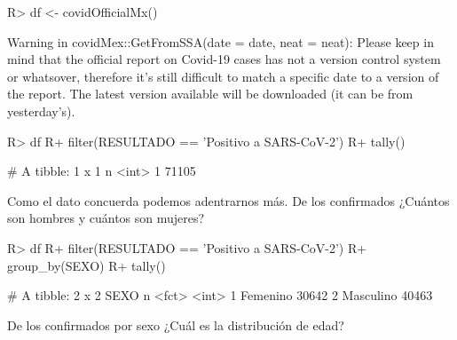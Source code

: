 \documentclass[
]{jss}
\begin{document}
\begin{CodeChunk}

\begin{CodeInput}
R> df <- covidOfficialMx()
\end{CodeInput}

\begin{CodeOutput}
Warning in covidMex::GetFromSSA(date = date, neat = neat): Please keep in mind
that the official report on Covid-19 cases has not a version control system or
whatsover, therefore it's still difficult to match a specific date to a version
of the report. The latest version available will be downloaded (it can be from
yesterday's).
\end{CodeOutput}

\begin{CodeInput}
R> df %
R+   filter(RESULTADO == 'Positivo a SARS-CoV-2') %
R+   tally()
\end{CodeInput}

\begin{CodeOutput}
# A tibble: 1 x 1
      n
  <int>
1 71105
\end{CodeOutput}
\end{CodeChunk}

Como el dato concuerda podemos adentrarnos más. De los confirmados
¿Cuántos son hombres y cuántos son mujeres?

\begin{CodeChunk}

\begin{CodeInput}
R> df %
R+   filter(RESULTADO == 'Positivo a SARS-CoV-2') %
R+   group_by(SEXO) %
R+   tally()
\end{CodeInput}

\begin{CodeOutput}
# A tibble: 2 x 2
  SEXO          n
  <fct>     <int>
1 Femenino  30642
2 Masculino 40463
\end{CodeOutput}
\end{CodeChunk}

De los confirmados por sexo ¿Cuál es la distribución de edad?
\end{document}

